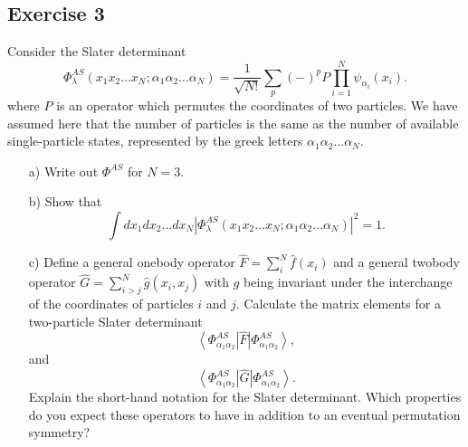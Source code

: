 \documentclass[prc]{revtex4}
\newcommand{\bra}[1]{\left\langle #1 \right|}
\newcommand{\ket}[1]{\left| #1 \right\rangle}
\begin{document}
\subsection*{Exercise 3}
Consider the Slater determinant
\[
\Phi_{\lambda}^{AS}(x_{1}x_{2}\dots x_{N};\alpha_{1}\alpha_{2}\dots\alpha_{N})
=\frac{1}{\sqrt{N!}}\sum_{p}(-)^{p}P\prod_{i=1}^{N}\psi_{\alpha_{i}}(x_{i}).
\]
where $P$ is an operator which permutes the coordinates of two particles. We have assumed here that the 
number of particles is the same as the number of available single-particle states, represented by the
greek letters $\alpha_{1}\alpha_{2}\dots\alpha_{N}$.
\begin{enumerate}
\item[a)] Write  out $\Phi^{AS}$ for $N=3$.  
\item[b)] Show that
\[
\int dx_{1}dx_{2}\dots dx_{N}\left\vert
\Phi_{\lambda}^{AS}(x_{1}x_{2}\dots x_{N};\alpha_{1}\alpha_{2}\dots\alpha_{N})
\right\vert^{2} = 1.
\]
\item[c)] Define a general onebody operator $\hat{F} = \sum_{i}^N\hat{f}(x_{i})$ and a general 
twobody operator $\hat{G}=\sum_{i>j}^N\hat{g}(x_{i},x_{j})$
with $g$ being invariant under the interchange of the coordinates of particles $i$ and $j$.
Calculate the matrix elements for a two-particle Slater determinant
\[
\bra{\Phi_{\alpha_{1}\alpha_{2}}^{AS}}\hat{F}\ket{\Phi_{\alpha_{1}\alpha_{2}}^{AS}},
\]
and
\[
\bra{\Phi_{\alpha_{1}\alpha_{2}}^{AS}}\hat{G}\ket{\Phi_{\alpha_{1}\alpha_{2}}^{AS}}.
\]
Explain the short-hand notation for the Slater determinant.
Which properties do you expect these operators to have in addition to an eventual permutation
symmetry?
\end{enumerate}
\end{document}
